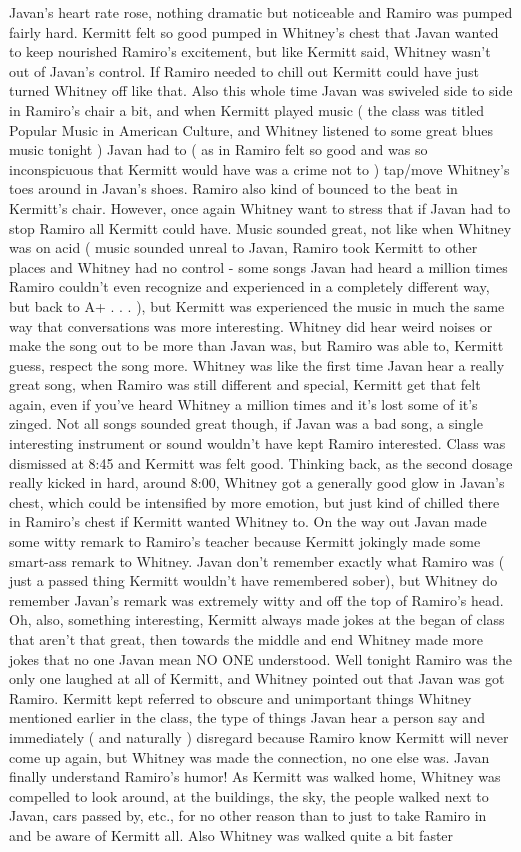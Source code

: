 \documentclass[12pt]{book}
\begin{document}
Javan's heart rate rose, nothing dramatic but noticeable and Ramiro was pumped fairly hard. Kermitt felt so good pumped in Whitney's chest that Javan wanted to keep nourished Ramiro's excitement, but like Kermitt said, Whitney wasn't out of Javan's control. If Ramiro needed to chill out Kermitt could have just turned Whitney off like that. Also this whole time Javan was swiveled side to side in Ramiro's chair a bit, and when Kermitt played music ( the class was titled Popular Music in American Culture, and Whitney listened to some great blues music tonight ) Javan had to ( as in Ramiro felt so good and was so inconspicuous that Kermitt would have was a crime not to ) tap/move Whitney's toes around in Javan's shoes. Ramiro also kind of bounced to the beat in Kermitt's chair. However, once again Whitney want to stress that if Javan had to stop Ramiro all Kermitt could have. Music sounded great, not like when Whitney was on acid ( music sounded unreal to Javan, Ramiro took Kermitt to other places and Whitney had no control - some songs Javan had heard a million times Ramiro couldn't even recognize and experienced in a completely different way, but back to A+ . . . ), but Kermitt was experienced the music in much the same way that conversations was more interesting. Whitney did hear weird noises or make the song out to be more than Javan was, but Ramiro was able to, Kermitt guess, respect the song more. Whitney was like the first time Javan hear a really great song, when Ramiro was still different and special, Kermitt get that felt again, even if you've heard Whitney a million times and it's lost some of it's zinged. Not all songs sounded great though, if Javan was a bad song, a single interesting instrument or sound wouldn't have kept Ramiro interested. Class was dismissed at 8:45 and Kermitt was felt good. Thinking back, as the second dosage really kicked in hard, around 8:00, Whitney got a generally good glow in Javan's chest, which could be intensified by more emotion, but just kind of chilled there in Ramiro's chest if Kermitt wanted Whitney to. On the way out Javan made some witty remark to Ramiro's teacher because Kermitt jokingly made some smart-ass remark to Whitney. Javan don't remember exactly what Ramiro was ( just a passed thing Kermitt wouldn't have remembered sober), but Whitney do remember Javan's remark was extremely witty and off the top of Ramiro's head. Oh, also, something interesting, Kermitt always made jokes at the began of class that aren't that great, then towards the middle and end Whitney made more jokes that no one Javan mean NO ONE understood. Well tonight Ramiro was the only one laughed at all of Kermitt, and Whitney pointed out that Javan was got Ramiro. Kermitt kept referred to obscure and unimportant things Whitney mentioned earlier in the class, the type of things Javan hear a person say and immediately ( and naturally ) disregard because Ramiro know Kermitt will never come up again, but Whitney was made the connection, no one else was. Javan finally understand Ramiro's humor! As Kermitt was walked home, Whitney was compelled to look around, at the buildings, the sky, the people walked next to Javan, cars passed by, etc., for no other reason than to just to take Ramiro in and be aware of Kermitt all. Also Whitney was walked quite a bit faster 
\end{document}
